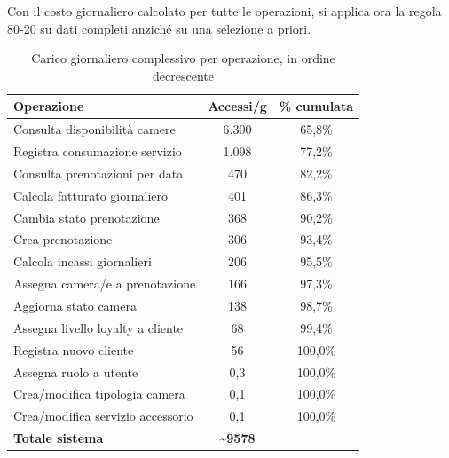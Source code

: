 \documentclass[a4paper,12pt]{report}
\begin{document}
Con il costo giornaliero calcolato per tutte le operazioni, si applica
ora la regola 80-20 su dati completi anziché su una selezione a priori.

\begin{table}[H]
    \centering
    \small
    \begin{tabular}{|p{6.2cm}|c|c|}
        \hline
        \rowcolor{headerblue}
        \textbf{Operazione}               & \textbf{Accessi/g}             & \textbf{\% cumulata} \\
        \hline
        Consulta disponibilità camere     & 6.300                          & 65,8\%               \\
        Registra consumazione servizio    & 1.098                          & 77,2\%               \\
        Consulta prenotazioni per data    & 470                            & 82,2\%               \\
        Calcola fatturato giornaliero     & 401                            & 86,3\%               \\
        Cambia stato prenotazione         & 368                            & 90,2\%               \\
        Crea prenotazione                 & 306                            & 93,4\%               \\
        Calcola incassi giornalieri       & 206                            & 95,5\%               \\
        Assegna camera/e a prenotazione   & 166                            & 97,3\%               \\
        Aggiorna stato camera             & 138                            & 98,7\%               \\
        Assegna livello loyalty a cliente & 68                             & 99,4\%               \\
        Registra nuovo cliente            & 56                             & 100,0\%              \\
        Assegna ruolo a utente            & 0,3                            & 100,0\%              \\
        Crea/modifica tipologia camera    & 0,1                            & 100,0\%              \\
        Crea/modifica servizio accessorio & 0,1                            & 100,0\%              \\
        \hline
        \rowcolor{gray!25}
        \textbf{Totale sistema}           & \textbf{\textasciitilde{}9578} &                      \\
        \hline
    \end{tabular}
    \caption{Carico giornaliero complessivo per operazione, in ordine decrescente}
    \label{tab:sintesiCarico}
\end{table}
\end{document}
